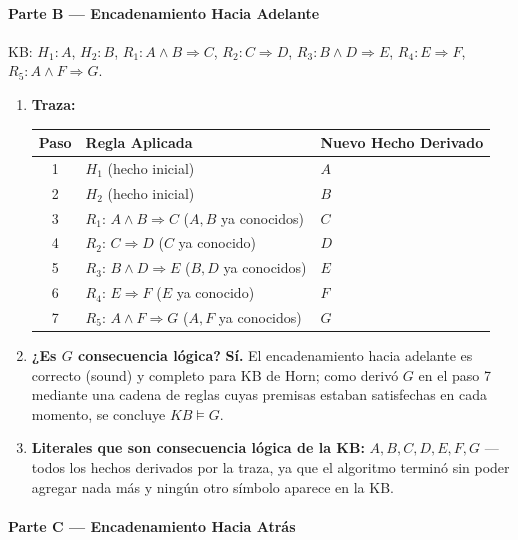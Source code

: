 \paragraph{Parte B --- Encadenamiento Hacia Adelante}

KB: $H_1: A$, $H_2: B$, $R_1: A\land B\Rightarrow C$, $R_2: C\Rightarrow D$, $R_3: B\land D
\Rightarrow E$, $R_4: E\Rightarrow F$, $R_5: A\land F\Rightarrow G$.

\begin{enumerate}
    \item \textbf{Traza:}\\
    \begin{tabular}{cll}
        \toprule
        Paso & Regla Aplicada & Nuevo Hecho Derivado \\
        \midrule
        1 & $H_1$ (hecho inicial) & $A$ \\
        2 & $H_2$ (hecho inicial) & $B$ \\
        3 & $R_1$: $A\land B\Rightarrow C$ ($A,B$ ya conocidos) & $C$ \\
        4 & $R_2$: $C\Rightarrow D$ ($C$ ya conocido) & $D$ \\
        5 & $R_3$: $B\land D\Rightarrow E$ ($B,D$ ya conocidos) & $E$ \\
        6 & $R_4$: $E\Rightarrow F$ ($E$ ya conocido) & $F$ \\
        7 & $R_5$: $A\land F\Rightarrow G$ ($A,F$ ya conocidos) & $G$ \\
        \bottomrule
    \end{tabular}

    \item \textbf{¿Es $G$ consecuencia lógica?} \textbf{Sí.} El encadenamiento hacia adelante es
    correcto (sound) y completo para KB de Horn; como derivó $G$ en el paso 7 mediante una cadena de
    reglas cuyas premisas estaban satisfechas en cada momento, se concluye $KB \models G$.

    \item \textbf{Literales que son consecuencia lógica de la KB:} $A, B, C, D, E, F, G$ — todos los
    hechos derivados por la traza, ya que el algoritmo terminó sin poder agregar nada más y ningún
    otro símbolo aparece en la KB.
\end{enumerate}

\paragraph{Parte C --- Encadenamiento Hacia Atrás}

